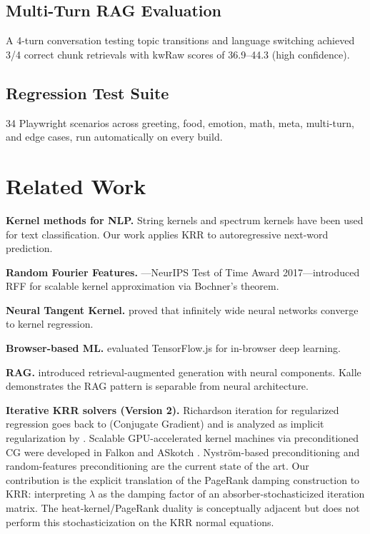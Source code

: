 \documentclass[11pt,a4paper]{article}
\begin{document}
\subsection{Multi-Turn RAG Evaluation}

A 4-turn conversation testing topic transitions and language switching achieved 3/4 correct chunk retrievals with kwRaw scores of 36.9--44.3 (high confidence).

\subsection{Regression Test Suite}

34 Playwright scenarios across greeting, food, emotion, math, meta, multi-turn, and edge cases, run automatically on every build.


\section{Related Work}

\textbf{Kernel methods for NLP.} String kernels \citep{lodhi2002text} and spectrum kernels \citep{leslie2002spectrum} have been used for text classification. Our work applies KRR to autoregressive next-word prediction.

\textbf{Random Fourier Features.} \citet{rahimi2007rff}---NeurIPS Test of Time Award 2017---introduced RFF for scalable kernel approximation via Bochner's theorem.

\textbf{Neural Tangent Kernel.} \citet{jacot2018ntk} proved that infinitely wide neural networks converge to kernel regression.

\textbf{Browser-based ML.} \citet{ma2019browser} evaluated TensorFlow.js for in-browser deep learning.

\textbf{RAG.} \citet{lewis2020rag} introduced retrieval-augmented generation with neural components. Kalle demonstrates the RAG pattern is separable from neural architecture.

\textbf{Iterative KRR solvers (Version 2).} Richardson iteration for regularized regression goes back to \citet{hestenes1952cg} (Conjugate Gradient) and is analyzed as implicit regularization by \citet{yao2007early}. Scalable GPU-accelerated kernel machines via preconditioned CG were developed in Falkon \citep{rudi2017falkon} and ASkotch \citep{rathore2024askotch}. Nystr\"om-based preconditioning \citep{frangella2023nystrom} and random-features preconditioning \citep{avron2017sketching} are the current state of the art. Our contribution is the explicit translation of the PageRank damping construction \citep{page1998pagerank,boldi2005damping} to KRR: interpreting $\lambda$ as the damping factor of an absorber-stochasticized iteration matrix. The heat-kernel/PageRank duality \citep{chung2007heatkernel} is conceptually adjacent but does not perform this stochasticization on the KRR normal equations.
\end{document}
